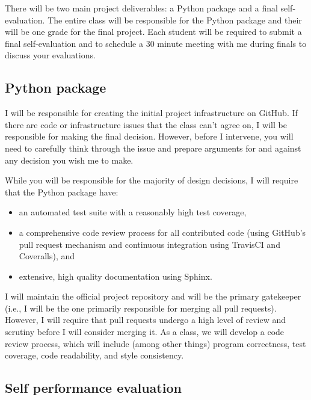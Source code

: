 \documentclass[11pt, oneside]{article}   	%
\begin{document}
There will be two main project deliverables: a Python package and a
final self-evaluation.  The entire class will be responsible for
the Python package and their will be one grade for the final project.
Each student will be required to submit a final self-evaluation
and to schedule a 30 minute meeting with me during finals to discuss
your evaluations.

\subsection{Python package}

I will be responsible for creating the initial project infrastructure
on GitHub.  If there are code or infrastructure issues that the
class can't agree on, I will be responsible for making the final
decision.  However, before I intervene, you will need to carefully
think through the issue and prepare arguments for and against
any decision you wish me to make.

While you will be responsible for the majority of design decisions,
I will require that the Python package have:

\begin{itemize}
\item an automated test suite with a reasonably high test coverage,
\item a comprehensive code review process for all contributed code (using
   GitHub's pull request mechanism and continuous integration using
   TravisCI and Coveralls), and
\item extensive, high quality documentation using Sphinx.
\end{itemize}

I will maintain the official project repository and will be the primary
gatekeeper (i.e., I will be the one primarily responsible for merging all pull
requests).  However, I will require that pull requests undergo a high level of
review and scrutiny before I will consider merging it.  As a class, we will
develop a code review process, which will include (among other things) program
correctness, test coverage, code readability, and style consistency.

\subsection{Self performance evaluation}
\end{document}
